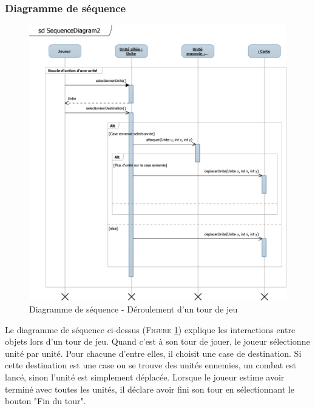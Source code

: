 \documentclass[a4paper,11pt]{article}
\begin{document}
		\subsubsection{Diagramme de séquence}
			\begin{figure}[ht!]
				\includegraphics{Diagrammes/Tour/sqTourDeJeu.png}
				\caption{Diagramme de séquence - Déroulement d'un tour de jeu}
				\label{fig:seqtour}
				\end{figure}
			\vspace*{1cm}
			Le diagramme de séquence ci-dessus (\textsc{Figure \ref{fig:seqtour}}) explique les interactions entre objets lors d'un tour de jeu. Quand c'est à son tour de jouer, le joueur sélectionne unité par unité. Pour chacune d'entre elles, il choisit une case de destination. Si cette destination est une case ou se trouve des unités ennemies, un combat est lancé, sinon l'unité est simplement déplacée. Lorsque le joueur estime avoir terminé avec toutes les unités, il déclare avoir fini son tour en sélectionnant le bouton "Fin du tour".
			\newpage
\end{document}

